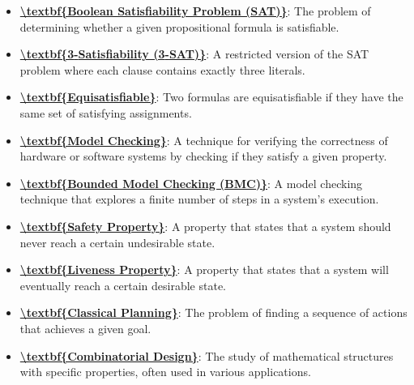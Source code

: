 \documentclass{article}%
\begin{document}
\begin{itemize}[leftmargin=*]
\item \href{https://www.math.purdue.edu/~yipn/351/13L1-Logic.pdf#page=15}{\textbf{\textbackslash{}textbf\{Boolean Satisfiability Problem (SAT)\}}}: The problem of determining whether a given propositional formula is satisfiable.%
\item \href{https://www.math.purdue.edu/~yipn/351/13L1-Logic.pdf#page=24}{\textbf{\textbackslash{}textbf\{3{-}Satisfiability (3{-}SAT)\}}}: A restricted version of the SAT problem where each clause contains exactly three literals.%
\item \href{https://www.math.purdue.edu/~yipn/351/13L1-Logic.pdf#page=24}{\textbf{\textbackslash{}textbf\{Equisatisfiable\}}}: Two formulas are equisatisfiable if they have the same set of satisfying assignments.%
\item \href{https://www.math.purdue.edu/~yipn/351/13L1-Logic.pdf#page=20}{\textbf{\textbackslash{}textbf\{Model Checking\}}}: A technique for verifying the correctness of hardware or software systems by checking if they satisfy a given property.%
\item \href{https://www.math.purdue.edu/~yipn/351/13L1-Logic.pdf#page=20}{\textbf{\textbackslash{}textbf\{Bounded Model Checking (BMC)\}}}: A model checking technique that explores a finite number of steps in a system's execution.%
\item \href{https://www.math.purdue.edu/~yipn/351/13L1-Logic.pdf#page=20}{\textbf{\textbackslash{}textbf\{Safety Property\}}}: A property that states that a system should never reach a certain undesirable state.%
\item \href{https://www.math.purdue.edu/~yipn/351/13L1-Logic.pdf#page=20}{\textbf{\textbackslash{}textbf\{Liveness Property\}}}: A property that states that a system will eventually reach a certain desirable state.%
\item \href{https://www.math.purdue.edu/~yipn/351/13L1-Logic.pdf#page=21}{\textbf{\textbackslash{}textbf\{Classical Planning\}}}: The problem of finding a sequence of actions that achieves a given goal.%
\item \href{https://www.math.purdue.edu/~yipn/351/13L1-Logic.pdf#page=22}{\textbf{\textbackslash{}textbf\{Combinatorial Design\}}}: The study of mathematical structures with specific properties, often used in various applications.%
\end{itemize}%
\end{document}

